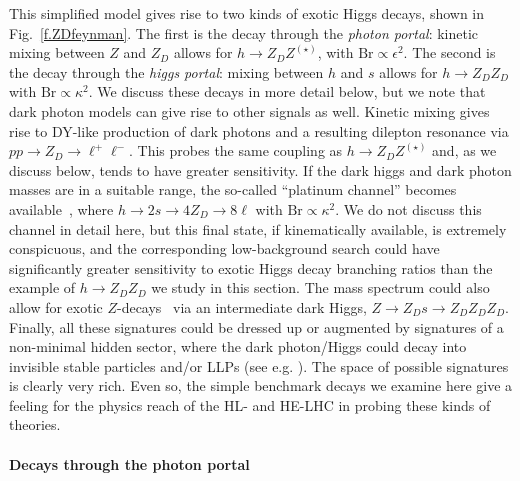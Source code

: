 This simplified model gives rise to two kinds of exotic Higgs decays, shown in Fig.~\ref{f.ZDfeynman}. The first is the decay through the \emph{photon portal}: kinetic mixing between $Z$ and $Z_D$ allows for $h\to Z_D Z^{(\star)}$, with $\mathrm{Br} \propto \epsilon^2$. The second is the decay through the \emph{higgs portal}: mixing between $h$ and $s$ allows for $h \to Z_D Z_D$ with $\mathrm{Br} \propto \kappa^2$. We discuss these decays in more detail below, but we note that dark photon models can give rise to other signals as well. 
%
Kinetic mixing gives rise to DY-like production of dark photons and a resulting dilepton resonance via $p p \to Z_D \to \ell^+ \ell^-$. This probes the same coupling as $h \to Z_D Z^{(\star)}$ and, as we discuss below, tends to have greater sensitivity. 
%
If the dark higgs and dark photon masses are in a suitable range, the so-called ``platinum channel'' becomes available~\cite{Izaguirre:2018atq}, where $h \to 2s \to 4 Z_D \to 8 \ell$ with $\mathrm{Br} \propto \kappa^2$. We do not discuss this channel in detail here, but this final state, if kinematically available, is extremely conspicuous, and the corresponding low-background search could have significantly greater sensitivity to exotic Higgs decay branching ratios than the example of $h \to Z_D Z_D$ we study in this section. 
%
The mass spectrum could also allow for exotic $Z$-decays~\cite{Blinov:2017dtk} via an intermediate dark Higgs, $Z \to Z_D s \to Z_D Z_D Z_D$. 
%
Finally, all these signatures could be dressed up or augmented by signatures of a non-minimal hidden sector, where the dark photon/Higgs could decay into invisible stable particles and/or LLPs (see e.g. \cite{Alexander:2016aln, Curtin:2018mvb}).
%
The space of possible signatures is clearly very rich. Even so, the simple benchmark decays we examine here give a feeling for the physics reach of the HL- and HE-LHC in probing these kinds of theories. 

\bigskip

\paragraph{Decays through the photon portal}



